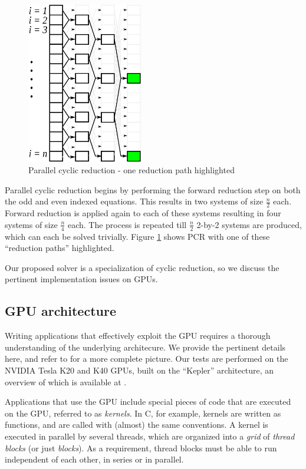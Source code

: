 \documentclass{elsarticle}
\begin{document}
\begin{figure}[h!]
\begin{center}
\includegraphics[height=200pt]{img/parallel-cyclic-reduction-single-path.eps}
\end{center}
\caption{Parallel cyclic reduction - one reduction path highlighted}
\label{fig:parallel-cyclic-reduction-single-path}
\end{figure}

Parallel cyclic reduction begins by
performing the forward reduction step on
both the odd and even indexed equations.
This results in two systems of size $\frac{n}{2}$ each.
Forward reduction is applied again to each of these systems
resulting in four systems of size $\frac{n}{4}$ each.
The process is repeated till $\frac{n}{2}$ 2-by-2 systems are produced,
which can each be solved trivially.
Figure \ref{fig:parallel-cyclic-reduction-single-path}
shows PCR with one of these ``reduction paths'' highlighted.

Our proposed solver is a specialization of cyclic reduction,
so we discuss the pertinent implementation issues on GPUs.

\subsection{GPU architecture}

Writing applications that effectively exploit the GPU
requires a thorough understanding of the underlying architecure.
We provide the pertinent details here,
and refer to \cite{GPUcomputingera} for a more complete picture.
Our tests are performed on the NVIDIA Tesla K20 and K40 GPUs,
built on the ``Kepler'' architecture,
an overview of which is available at \cite{Keplerwhitepaper}.

Applications that use the GPU include special
pieces of code that are executed on the GPU,
referred to as \emph{kernels}.
In C, for example, kernels are written as functions,
and are called with (almost) the same conventions.
A kernel is executed in parallel by several threads,
which are organized into a \emph{grid} of \emph{thread blocks}
(or just \emph{blocks}).
As a requirement, thread blocks must be able to run
independent of each other,
in series or in parallel.
\end{document}
